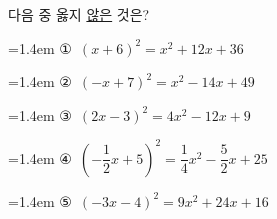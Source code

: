 다음 중 옳지 \underline{않은} 것은?
\par\medskip\par\noindent\hangindent=1.4em {\small ①}\ $(x+6)^2=x^2+12x+36$\par\noindent\hangindent=1.4em {\small ②}\ $(-x+7)^2=x^2-14x+49$\par\noindent\hangindent=1.4em {\small ③}\ $(2x-3)^2=4x^2-12x+9$\par\noindent\hangindent=1.4em {\small ④}\ $\left(-\dfrac{1}{2}x+5\right)^2=\dfrac{1}{4}x^2-\dfrac{5}{2}x+25$\par\noindent\hangindent=1.4em {\small ⑤}\ $(-3x-4)^2=9x^2+24x+16$\par\medskip
